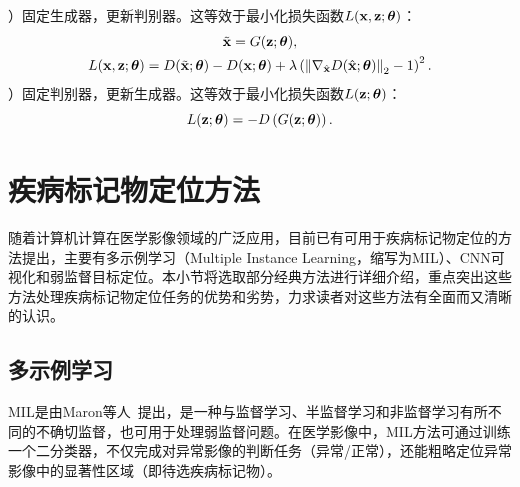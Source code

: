 ）固定生成器，更新判别器。这等效于最小化损失函数$L(\mathbf{x},\mathbf{z};\mbox{\boldmath $\theta$})$：
\begin{gather}
	\tilde{{\mathbf{x}}} = G({\mathbf{z}};\mbox{\boldmath $\theta$}), \\
	L(\mathbf{x},\mathbf{z};\mbox{\boldmath $\theta$})=D(\tilde{{\mathbf{x}}};\mbox{\boldmath $\theta$})-D({\mathbf{x}};\mbox{\boldmath $\theta$})+\lambda\left(\left\|\nabla_{\hat{\mathbf{x}}} D(\hat{\mathbf{x}};\mbox{\boldmath $\theta$})\right\|_{2}-1\right)^{2}.
\end{gather}
）固定判别器，更新生成器。这等效于最小化损失函数$L(\mathbf{z};\mbox{\boldmath $\theta$})$：
\begin{equation}
	L(\mathbf{z};\mbox{\boldmath $\theta$})=-D\left(G(\mathbf{z};\mbox{\boldmath $\theta$})\right).
\end{equation}
\section{疾病标记物定位方法}\label{sec:related_work}
随着计算机计算在医学影像领域的广泛应用，目前已有可用于疾病标记物定位的方法提出，主要有多示例学习（Multiple Instance Learning，缩写为MIL）、CNN可视化和弱监督目标定位。本小节将选取部分经典方法进行详细介绍，重点突出这些方法处理疾病标记物定位任务的优势和劣势，力求读者对这些方法有全面而又清晰的认识。
\subsection{多示例学习}
MIL是由Maron等人~\cite{maron1998framework}提出，是一种与监督学习、半监督学习和非监督学习有所不同的不确切监督，也可用于处理弱监督问题。在医学影像中，MIL方法可通过训练一个二分类器，不仅完成对异常影像的判断任务（异常/正常），还能粗略定位异常影像中的显著性区域（即待选疾病标记物）。

